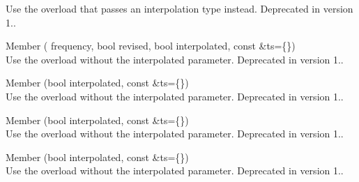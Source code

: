 \begin{DoxyRefList}
\label{deprecated__deprecated000027}%
%
Use the overload that passes an interpolation type instead. Deprecated in version 1..  
\item[Member \doxylink{class_quant_lib_1_1_y_y_a_u_c_p_i_aa865108fc400bf6d1a4c75f36e60b4b3}{Quant\+Lib\+::YYAUCPI\+::YYAUCPI} (\doxylink{namespace_quant_lib_abfa020992bcf412e2bc99f56d4381b4a}{Frequency} frequency, bool revised, bool interpolated, const \doxylink{class_quant_lib_1_1_handle}{Handle$<$ Yo\+YInflation\+Term\+Structure $>$} \&ts=\{\})]\hfill \\
\label{deprecated__deprecated000092}%
%
Use the overload without the interpolated parameter. Deprecated in version 1..  
\item[Member \doxylink{class_quant_lib_1_1_y_y_e_u_h_i_c_p_acd5a5308b009f09d34181aaff50766fd}{Quant\+Lib\+::YYEUHICP\+::YYEUHICP} (bool interpolated, const \doxylink{class_quant_lib_1_1_handle}{Handle$<$ Yo\+YInflation\+Term\+Structure $>$} \&ts=\{\})]\hfill \\
\label{deprecated__deprecated000093}%
%
Use the overload without the interpolated parameter. Deprecated in version 1..  
\item[Member \doxylink{class_quant_lib_1_1_y_y_e_u_h_i_c_p_x_t_a9593f8b7b76ee8512c10f7824d3f4c84}{Quant\+Lib\+::YYEUHICPXT\+::YYEUHICPXT} (bool interpolated, const \doxylink{class_quant_lib_1_1_handle}{Handle$<$ Yo\+YInflation\+Term\+Structure $>$} \&ts=\{\})]\hfill \\
\label{deprecated__deprecated000094}%
%
Use the overload without the interpolated parameter. Deprecated in version 1..  
\item[Member \doxylink{class_quant_lib_1_1_y_y_f_r_h_i_c_p_a0371a188a452828c78d56dfd931b68e2}{Quant\+Lib\+::YYFRHICP\+::YYFRHICP} (bool interpolated, const \doxylink{class_quant_lib_1_1_handle}{Handle$<$ Yo\+YInflation\+Term\+Structure $>$} \&ts=\{\})]\hfill \\
\label{deprecated__deprecated000095}%
%
Use the overload without the interpolated parameter. Deprecated in version 1..  
\item[Member \doxylink{class_quant_lib_1_1_y_y_generic_c_p_i_aa4339663a54cfc1efc331a8f13410c0e}{Quant\+Lib\+::YYGeneric\+CPI\+::YYGeneric\+CPI} (\doxylink{namespace_quant_lib_abfa020992bcf412e2bc99f56d4381b4a}{Frequency} frequency, bool revised, bool interpolated, const \doxylink{class_quant_lib_1_1_period}{Period} \&lag, const \doxylink{class_quant_lib_1_1_currency}{Currency} \&ccy, const \doxylink{class_quant_lib_1_1_handle}{Handle$<$ Yo\+YInflation\+Term\+Structure $>$} \&ts=\{\})]\hfill \\

\end{DoxyRefList}
